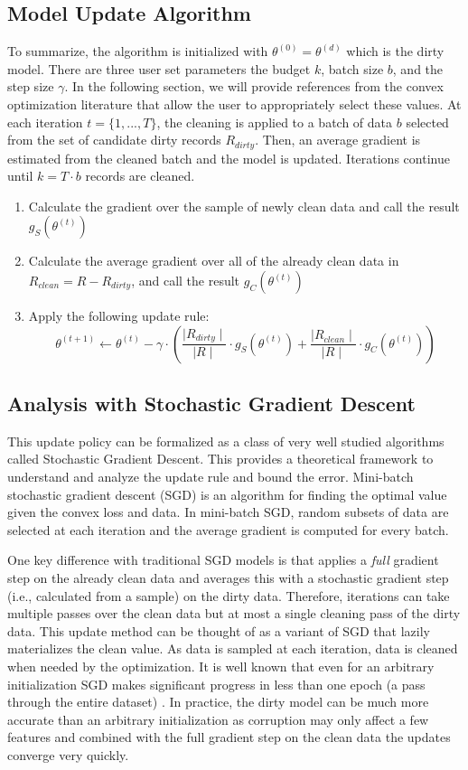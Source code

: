 \subsection{Model Update Algorithm}
To summarize, the algorithm is initialized with $\theta^{(0)} = \theta^{(d)}$ which is the dirty model.
There are three user set parameters the budget $k$, batch size $b$, and the step size $\gamma$.
In the following section, we will provide references from the convex optimization literature that allow the user to appropriately select these values.
At each iteration $t=\{1,...,T\}$, the cleaning is applied to a batch of data $b$ selected from the set of candidate dirty records $R_{dirty}$.
Then, an average gradient is estimated from the cleaned batch and the model is updated.
Iterations continue until $k = T \cdot b$ records are cleaned.

\begin{enumerate}[noitemsep]
	\item Calculate the gradient over the sample of newly clean data and call the result $g_S(\theta^{(t)})$
	\item Calculate the average gradient over all of the already clean data in $R_{clean}=R-R_{dirty}$, and call the result $g_C(\theta^{(t)})$
	\item Apply the following update rule:
	\[
	\theta^{(t+1)} \leftarrow \theta^{(t)} - \gamma \cdot(\frac{\mid R_{dirty} \mid}{\mid R \mid} \cdot g_S(\theta^{(t)}) + \frac{\mid R_{clean} \mid}{\mid R \mid} \cdot  g_C(\theta^{(t)}))
	\]
\end{enumerate} 

\subsection{Analysis with Stochastic Gradient Descent}\label{sgd}
This update policy can be formalized as a class of very well studied algorithms called Stochastic Gradient Descent.
This provides a theoretical framework to understand and analyze the update rule and bound the error.
Mini-batch stochastic gradient descent (SGD) is an algorithm for finding the optimal value
given the convex loss and data.
In mini-batch SGD, random subsets of data are selected at each iteration and the average gradient is computed for every batch.

One key difference with traditional SGD models is that \sys applies a \emph{full} gradient step on the already clean data and averages this with a stochastic gradient step (i.e., calculated from a sample) on the dirty data. 
Therefore, \sys iterations can take multiple passes over the clean data but at most a single cleaning pass of the dirty data.
This update method can be thought of as a variant of SGD that lazily materializes the clean value.
As data is sampled at each iteration, data is cleaned when needed by the optimization.
It is well known that even for an arbitrary initialization SGD makes significant progress in less than one epoch (a pass through the entire dataset) \cite{bottou2012stochastic}.
In practice, the dirty model can be much more accurate than an arbitrary initialization as corruption may only affect a few features and combined with the full gradient step on the clean data the updates converge very quickly.

